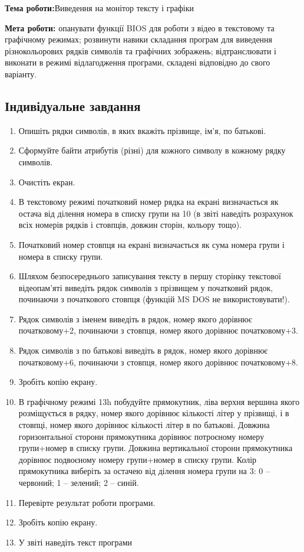 \documentclass[12pt]{extarticle}
\begin{document}
\textbf{Тема роботи:}Виведення на монітор тексту і графіки

\vspace{12pt}

\textbf{Мета роботи:} опанувати функції BIOS для роботи з відео в текстовому
та графічному режимах; розвинути навики складання програм для виведення
різнокольорових рядків символів та графічних зображень; відтранслювати і
виконати в режимі відлагодження програми, складені відповідно до свого
варіанту.

\subsection*{Індивідуальне завдання}
\begin{enumerate}
\item Опишіть рядки символів, в яких вкажіть прізвище, ім’я, по батькові.
\item Сформуйте байти атрибутів (різні) для кожного символу в кожному
рядку символів.
\item Очистіть екран.
\item В текстовому режимі початковий номер рядка на екрані визначається як
остача від ділення номера в списку групи на 10 (в звіті наведіть розрахунок всіх
номерів рядків і стовпців, довжин сторін, кольору тощо).
\item Початковий номер стовпця на екрані визначається як сума номера групи
і номера в списку групи.
\item Шляхом безпосереднього записування тексту в першу сторінку
текстової відеопам'яті виведіть рядок символів з прізвищем у початковий рядок,
починаючи з початкового стовпця (функцій MS DOS не використовувати!).
\item Рядок символів з іменем виведіть в рядок, номер якого дорівнює
початковому+2, починаючи з стовпця, номер якого дорівнює початковому+3.
\item Рядок символів з по батькові виведіть в рядок, номер якого дорівнює
початковому+6, починаючи з стовпця, номер якого дорівнює початковому+8.
\item Зробіть копію екрану.
\item В графічному режимі 13h побудуйте прямокутник, ліва верхня вершина
якого розміщується в рядку, номер якого дорівнює кількості літер у прізвищі, і в
стовпці, номер якого дорівнює кількості літер в по батькові. Довжина
горизонтальної сторони прямокутника дорівнює потроєному номеру
групи+номер в списку групи. Довжина вертикальної сторони прямокутника
дорівнює подвоєному номеру групи+номер в списку групи. Колір прямокутника
виберіть за остачею від ділення номера групи на 3: 0 – червоний; 1 – зелений; 2
– синій.
\item Перевірте результат роботи програми.
\item Зробіть копію екрану.
\item У звіті наведіть текст програми
\end{enumerate}
\end{document}
